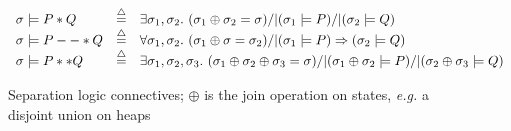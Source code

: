\begin{figure}
{\footnotesize
\[
\begin{array}{lcl}
\sigma |= P * Q & \mathbin{\stackrel{\triangle}{=}} & \exists \sigma_1, \sigma_2.~ (\sigma_1 \oplus \sigma_2 = \sigma) /| (\sigma_1 |= P) /| (\sigma_2 |= Q)\\
\sigma |= P --* Q & \mathbin{\stackrel{\triangle}{=}} & \forall \sigma_1, \sigma_2.~ (\sigma_1 \oplus \sigma = \sigma_2) /| (\sigma_1 |= P) => (\sigma_2 |= Q) \\
\sigma |= P ** Q & \mathbin{\stackrel{\triangle}{=}} & \exists \sigma_1, \sigma_2, \sigma_3.~ (\sigma_1 \oplus \sigma_2 \oplus \sigma_3 = \sigma) /| (\sigma_1 \oplus \sigma_2 |= P) /| (\sigma_2 \oplus \sigma_3 |= Q)
\end{array}
\]
}
\vspace{-1em}
\caption{Separation logic connectives; $\oplus$ is the join operation on states, \emph{e.g.} a disjoint union on heaps}
\label{fig:seplogsem}
\vspace*{-1em}
\end{figure} 